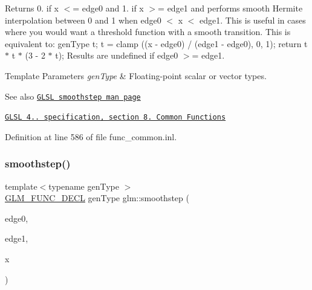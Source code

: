 Returns 0. if x $<$= edge0 and 1. if x $>$= edge1 and performs smooth Hermite interpolation between 0 and 1 when edge0 $<$ x $<$ edge1. This is useful in cases where you would want a threshold function with a smooth transition. This is equivalent to\+: gen\+Type t; t = clamp ((x -\/ edge0) / (edge1 -\/ edge0), 0, 1); return t $\ast$ t $\ast$ (3 -\/ 2 $\ast$ t); Results are undefined if edge0 $>$= edge1.


\begin{DoxyTemplParams}{Template Parameters}
{\em gen\+Type} & Floating-\/point scalar or vector types.\\
\hline
\end{DoxyTemplParams}
\begin{DoxySeeAlso}{See also}
\href{http://www.opengl.org/sdk/docs/manglsl/xhtml/smoothstep.xml}{\tt G\+L\+SL smoothstep man page} 

\href{http://www.opengl.org/registry/doc/GLSLangSpec.4.20.8.pdf}{\tt G\+L\+SL 4.. specification, section 8. Common Functions} 
\end{DoxySeeAlso}


Definition at line 586 of file func\+\_\+common.\+inl.

\mbox{\label{group__core__func__common_ga1e7b9e668a0bd2f494a1d49b871a50ea}} 
\subsubsection{\texorpdfstring{smoothstep()}{smoothstep()}\hspace{0.1cm}{\footnotesize\ttfamily [2/2]}}
{\footnotesize\ttfamily template$<$typename gen\+Type $>$ \\
\hyperlink{setup_8hpp_ab2d052de21a70539923e9bcbf6e83a51}{G\+L\+M\+\_\+\+F\+U\+N\+C\+\_\+\+D\+E\+CL} gen\+Type glm\+::smoothstep (\begin{DoxyParamCaption}\item[{typename gen\+Type\+::value\+\_\+type const \&}]{edge0,  }\item[{typename gen\+Type\+::value\+\_\+type const \&}]{edge1,  }\item[{gen\+Type const \&}]{x }\end{DoxyParamCaption})}

\mbox{\label{group__core__func__common_gaf21c84759af7799f573865f70c2f0a86}} 
